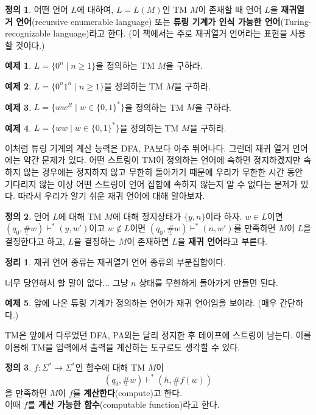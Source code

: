\documentclass[b5paper]{book}
\theoremstyle{definition}
\newtheorem{defn}{정의}[chapter]
\newtheorem{thm}{정리}[chapter]
\newtheorem{ex}{예제}[chapter]
\newenvironment{pf*}{\pushQED{\qed}\pf}{\popQED\endpf}
\begin{document}
\begin{defn}
    어떤 언어 $L$에 대하여, $L = L(M)$인 TM $M$이 존재할 때 언어 $L$을 
    \textbf{재귀열거 언어}(recursive enumerable language) 또는 
    \textbf{튜링 기계가 인식 가능한 언어}(Turing-recognizable language)라고 한다. (이 책에서는 주로
    재귀열거 언어라는 표현을 사용할 것이다.)
\end{defn}
\begin{ex}
    $L = \{0^n \;\vert\; n \ge 1\}$을 정의하는 TM $M$을 구하라.
\end{ex}
\begin{ex}
    $L = \{0^n1^n \;\vert\; n \ge 1\}$을 정의하는 TM $M$을 구하라.
\end{ex}
\begin{ex}
    $L = \{w w^R \;\vert\; w \in \{0,1\}^*\}$을 정의하는 TM $M$을 구하라.
\end{ex}
\begin{ex}
    $L = \{ww \;\vert\; w \in \{0,1\}^*\}$을 정의하는 TM $M$을 구하라.
\end{ex}
이처럼 튜링 기계의 계산 능력은 DFA, PA보다 아주 뛰어나다. 그런데 재귀 열거 언어에는 약간 문제가 있다.
어떤 스트링이 TM이 정의하는 언어에 속하면 정지하겠지만 속하지 않는 경우에는
정지하지 않고 무한히 돌아가기 때문에 우리가 무한한 시간 동안 기다리지 않는 이상 
어떤 스트링이 언어 집합에 속하지 않는지 알 수 없다는 문제가 있다. 따라서 우리가 알기 쉬운 재귀 언어에 
대해 알아보자.
\begin{defn}
    언어 $L$에 대해 TM $M$에 대해 정지상태가 $\{y,n\}$이라 하자.
    $w \in L$이면 $(q_0, \underline{\#}w) \vdash^* (y, w')$이고 
    $w \notin L$이면 $(q_0, \underline{\#}w) \vdash^* (n, w')$를 만족하면 $M$이 $L$을 결정한다고 하고, 
    $L$을 결정하는 $M$이 존재하면 $L$을 \textbf{재귀 언어}라고 부른다.
\end{defn}
\begin{thm}
    재귀 언어 종류는 재귀열거 언어 종류의 부분집합이다.
\end{thm}
\begin{pf*}
    너무 당연해서 할 말이 없다... 그냥 $n$ 상태를 무한하게 돌아가게 만들면 된다.
\end{pf*}
\begin{ex}
    앞에 나온 튜링 기계가 정의하는 언어가 재귀 언어임을 보여라. (매우 간단하다.)
\end{ex}
TM은 앞에서 다루었던 DFA, PA와는 달리 정지한 후 테이프에 스트링이 남는다.
이를 이용해 TM을 입력에서 출력을 계산하는 도구로도 생각할 수 있다.
\begin{defn}
    $f: \Sigma^* \rightarrow \Sigma^*$인 함수에 대해 TM $M$이
    $$(q_0, \underline{\#}w) \vdash^* (h, \underline{\#}f(w))$$
    을 만족하면 $M$이 $f$를 \textbf{계산한다}(compute)고 한다. \\ 이때 $f$를
    \textbf{계산 가능한 함수}(computable function)라고 한다. 
\end{defn}
\end{document}
